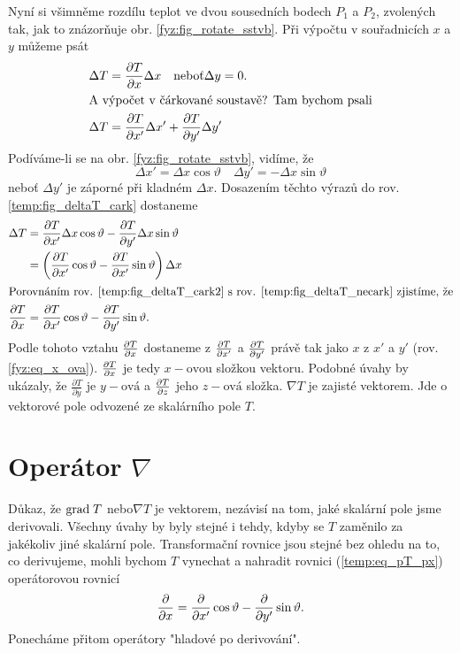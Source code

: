     Nyní si všimněme rozdílu teplot ve dvou sousedních bodech $P_1$ a $P_2$, zvolených tak, jak to
    znázorňuje obr. \ref{fyz:fig_rotate_sstvb}. Při výpočtu v souřadnicích $x$ a $y$ můžeme psát
    \begin{align}
      \Delta T &= \frac{\partial T}{\partial x}\Delta x \quad
                  \text{neboť} \Delta y=0.   \label{temp:fig_deltaT_necark} \\ 
      \shortintertext{A výpočet v čárkované soustavě? Tam bychom psali}
      \Delta T &= \frac{\partial T}{\partial x'}\Delta x' +
                  \frac{\partial T}{\partial y'}\Delta y'      \label{temp:fig_deltaT_cark}
    \end{align}
    Podíváme-li se na obr. \ref{fyz:fig_rotate_sstvb}, vidíme, že
    \begin{equation*}
      \Delta x' =  \Delta x\cos\vartheta \quad \Delta y' = -\Delta x\sin\vartheta
    \end{equation*}
    neboť $\Delta y'$ je záporné při kladném $\Delta x$. Dosazením těchto výrazů do rov.    
    \ref{temp:fig_deltaT_cark} dostaneme
    \begin{align}
      \Delta T    &=  \frac{\partial T}{\partial x'}\Delta x\cos\vartheta
                     -\frac{\partial T}{\partial y'}\Delta x\sin\vartheta  \nonumber  \\
                  &=  \left(\frac{\partial T}{\partial x'}\cos\vartheta   -
                      \frac{\partial T}{\partial x'}\sin\vartheta\right)\Delta x  \label{temp:fig_deltaT_cark2} \\
      \shortintertext{Porovnáním rov. \ref{temp:fig_deltaT_cark2} s rov.   
                      \ref{temp:fig_deltaT_necark} zjistíme, že}
      \frac{\partial T}{\partial x} &=  \frac{\partial T}{\partial x'}\cos\vartheta - \frac{\partial T}{\partial y'}\sin\vartheta. \label{temp:eq_pT_px}
    \end{align}
    Podle tohoto vztahu $\frac{\partial T}{\partial x}$ dostaneme z $\frac{\partial T}{\partial x'}$ a $\frac{\partial T}{\partial y'}$ právě tak jako $x$ 
    z $x'$ a $y'$ (rov. \ref{fyz:eq_x_ova}). $\frac{\partial T}{\partial x}$ je tedy $x-\text{ovou}$ složkou vektoru. 
    Podobné úvahy by ukázaly, že $\frac{\partial T}{\partial y}$ je $y-\text{ová}$ a $\frac{\partial T}{\partial z}$ 
    jeho $z-\text{ová}$ složka. $\nabla T$ je zajisté vektorem. Jde o vektorové pole odvozené ze 
    skalárního pole $T$.
       
  \section{Operátor \texorpdfstring{\(\nabla\)}{nabla}}
    \cite[s.~34]{Feynman02} Důkaz, že $\mathrm{grad\;}T$ nebo$\nabla T$ je vektorem, nezávisí na tom, jaké 
    skalární pole jsme derivovali. Všechny úvahy by byly stejné i tehdy, kdyby se $T$ zaměnilo za 
    jakékoliv jiné skalární pole. Transformační rovnice jsou stejné bez ohledu na to, co derivujeme, 
    mohli bychom $T$ vynechat a nahradit rovnici (\ref{temp:eq_pT_px}) operátorovou rovnicí
    \begin{equation}\label{temp:eq_operatorova_rce}
      \frac{\partial  }{\partial x}=\frac{\partial  }{\partial x'}\cos\vartheta - \frac{\partial  }{\partial y'}\sin\vartheta.
    \end{equation}
    Ponecháme přitom operátory "hladové po derivování".

